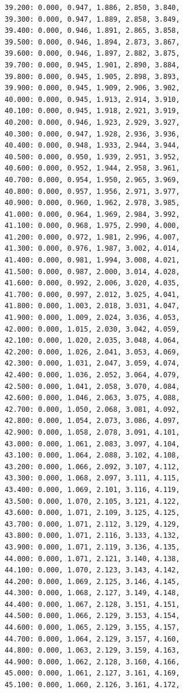 \documentclass[12pt, a4paper]{article}
\begin{document}
\begin{scriptsize}
\begin{ttfamily}
\begin{lstlisting}
39.200: 0.000, 0.947, 1.886, 2.850, 3.840, 
39.300: 0.000, 0.947, 1.889, 2.858, 3.849, 
39.400: 0.000, 0.946, 1.891, 2.865, 3.858, 
39.500: 0.000, 0.946, 1.894, 2.873, 3.867, 
39.600: 0.000, 0.946, 1.897, 2.882, 3.875, 
39.700: 0.000, 0.945, 1.901, 2.890, 3.884, 
39.800: 0.000, 0.945, 1.905, 2.898, 3.893, 
39.900: 0.000, 0.945, 1.909, 2.906, 3.902, 
40.000: 0.000, 0.945, 1.913, 2.914, 3.910, 
40.100: 0.000, 0.945, 1.918, 2.921, 3.919, 
40.200: 0.000, 0.946, 1.923, 2.929, 3.927, 
40.300: 0.000, 0.947, 1.928, 2.936, 3.936, 
40.400: 0.000, 0.948, 1.933, 2.944, 3.944, 
40.500: 0.000, 0.950, 1.939, 2.951, 3.952, 
40.600: 0.000, 0.952, 1.944, 2.958, 3.961, 
40.700: 0.000, 0.954, 1.950, 2.965, 3.969, 
40.800: 0.000, 0.957, 1.956, 2.971, 3.977, 
40.900: 0.000, 0.960, 1.962, 2.978, 3.985, 
41.000: 0.000, 0.964, 1.969, 2.984, 3.992, 
41.100: 0.000, 0.968, 1.975, 2.990, 4.000, 
41.200: 0.000, 0.972, 1.981, 2.996, 4.007, 
41.300: 0.000, 0.976, 1.987, 3.002, 4.014, 
41.400: 0.000, 0.981, 1.994, 3.008, 4.021, 
41.500: 0.000, 0.987, 2.000, 3.014, 4.028, 
41.600: 0.000, 0.992, 2.006, 3.020, 4.035, 
41.700: 0.000, 0.997, 2.012, 3.025, 4.041, 
41.800: 0.000, 1.003, 2.018, 3.031, 4.047, 
41.900: 0.000, 1.009, 2.024, 3.036, 4.053, 
42.000: 0.000, 1.015, 2.030, 3.042, 4.059, 
42.100: 0.000, 1.020, 2.035, 3.048, 4.064, 
42.200: 0.000, 1.026, 2.041, 3.053, 4.069, 
42.300: 0.000, 1.031, 2.047, 3.059, 4.074, 
42.400: 0.000, 1.036, 2.052, 3.064, 4.079, 
42.500: 0.000, 1.041, 2.058, 3.070, 4.084, 
42.600: 0.000, 1.046, 2.063, 3.075, 4.088, 
42.700: 0.000, 1.050, 2.068, 3.081, 4.092, 
42.800: 0.000, 1.054, 2.073, 3.086, 4.097, 
42.900: 0.000, 1.058, 2.078, 3.091, 4.101, 
43.000: 0.000, 1.061, 2.083, 3.097, 4.104, 
43.100: 0.000, 1.064, 2.088, 3.102, 4.108, 
43.200: 0.000, 1.066, 2.092, 3.107, 4.112, 
43.300: 0.000, 1.068, 2.097, 3.111, 4.115, 
43.400: 0.000, 1.069, 2.101, 3.116, 4.119, 
43.500: 0.000, 1.070, 2.105, 3.121, 4.122, 
43.600: 0.000, 1.071, 2.109, 3.125, 4.125, 
43.700: 0.000, 1.071, 2.112, 3.129, 4.129, 
43.800: 0.000, 1.071, 2.116, 3.133, 4.132, 
43.900: 0.000, 1.071, 2.119, 3.136, 4.135, 
44.000: 0.000, 1.071, 2.121, 3.140, 4.138, 
44.100: 0.000, 1.070, 2.123, 3.143, 4.142, 
44.200: 0.000, 1.069, 2.125, 3.146, 4.145, 
44.300: 0.000, 1.068, 2.127, 3.149, 4.148, 
44.400: 0.000, 1.067, 2.128, 3.151, 4.151, 
44.500: 0.000, 1.066, 2.129, 3.153, 4.154, 
44.600: 0.000, 1.065, 2.129, 3.155, 4.157, 
44.700: 0.000, 1.064, 2.129, 3.157, 4.160, 
44.800: 0.000, 1.063, 2.129, 3.159, 4.163, 
44.900: 0.000, 1.062, 2.128, 3.160, 4.166, 
45.000: 0.000, 1.061, 2.127, 3.161, 4.169, 
45.100: 0.000, 1.060, 2.126, 3.161, 4.172, 

\end{lstlisting}
\end{ttfamily}
\end{scriptsize}
\end{document}
